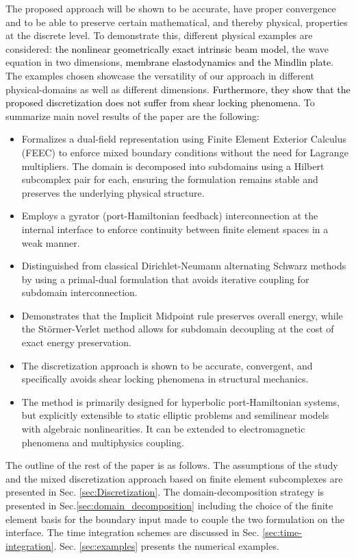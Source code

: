 \documentclass[11pt,a4paper]{article}
\newcommand{\revtwo}[1]{{\textcolor{black}{#1}}}
\newcommand{\revthree}[1]{{\textcolor{black}{#1}}}
\begin{document}
 The proposed approach will be shown to be accurate, have proper convergence and to be able to preserve certain mathematical, and thereby physical, properties at the discrete level. To demonstrate this, different physical examples are considered: \revtwo{the nonlinear geometrically exact intrinsic beam model}, the wave equation in two dimensions, \revthree{membrane elastodynamics and the Mindlin plate}. The examples chosen showcase the versatility of our approach in different physical-domains as well as different dimensions.  \revthree{Furthermore, they show that the proposed discretization does not suffer from shear locking phenomena.} To summarize main novel results of the paper are the following: 
 \begin{itemize} 
 \item Formalizes a dual-field representation using Finite Element Exterior Calculus (FEEC) to enforce mixed boundary conditions without the need for Lagrange multipliers. The domain is decomposed into subdomains using a Hilbert subcomplex pair for each, ensuring the formulation remains stable and preserves the underlying physical structure. 
 \item Employs a gyrator (port-Hamiltonian feedback) interconnection at the internal interface to enforce continuity between finite element spaces in a weak manner. \item Distinguished from classical Dirichlet-Neumann alternating Schwarz methods by using a primal-dual formulation that avoids iterative coupling for subdomain interconnection. 
 \item Demonstrates that the Implicit Midpoint rule preserves overall energy, while the Störmer-Verlet method allows for subdomain decoupling at the cost of exact energy preservation. 
 \item The discretization approach is shown to be accurate, convergent, and specifically avoids shear locking phenomena in structural mechanics. 
 \item The method is primarily designed for hyperbolic port-Hamiltonian systems, but explicitly extensible to static elliptic problems and semilinear models with algebraic nonlinearities. It can be extended to electromagnetic phenomena and multiphysics coupling.
 \end{itemize}

 
 The outline of the rest of the paper is as follows. The assumptions of the study and the mixed discretization approach based on finite element subcomplexes are presented in Sec. \ref{sec:Discretization}. The domain-decomposition strategy is presented in Sec.\ref{sec:domain_decomposition} including the choice of the finite element basis for the boundary input made to couple the two formulation on the interface. The time integration schemes are discussed in Sec. \ref{sec:time-integration}. Sec. \ref{sec:examples} presents the numerical examples.
\end{document}
